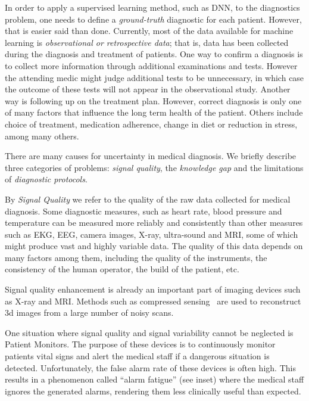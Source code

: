 \documentclass[11pt]{pnas-new}
\begin{document}

In order to apply a supervised learning method, such as  DNN, to the
diagnostics problem, one needs to define a {\em ground-truth} diagnostic for each
patient. However, that is easier said than done. Currently, most of
the data available for machine learning is {\em observational or
retrospective data}; that is, data has been collected
during the diagnosis and treatment of patients.
One way to confirm a diagnosis is to collect more information through
additional examinations and tests. However the attending medic might
judge additional tests to be unnecessary, in which case the outcome of these tests will not
appear in the observational study.
Another way is following up on the treatment plan. However, correct
diagnosis is only one of many factors that influence the long term
health of the patient. Others include choice of treatment, medication
adherence, change in diet or reduction in stress, among many others.


There are many causes for uncertainty in medical diagnosis. We briefly
describe three categories of problems: {\em signal quality}, the {\em
  knowledge gap} and the limitations of {\em diagnostic protocols}.

 
By {\em Signal Quality} we refer to the quality of the raw data
collected for medical diagnosis. Some diagnostic measures, such
as heart rate, blood pressure and temperature can be measured more reliably
and consistently than other
measures such as EKG, EEG, camera images, X-ray, ultra-sound and MRI, some of which might
produce vast and highly variable data. The quality of this data
depends on many factors among them, including the quality of the instruments, the
consistency of the human operator, the build of the patient, etc.

Signal quality enhancement is already an
important part of imaging devices such as X-ray and MRI. Methods such
as compressed sensing~\cite{lustig2008compressed} are used to
reconstruct 3d images from a large number of noisy scans.


  One situation where signal quality and signal variability cannot be neglected is Patient Monitors. 
  The purpose of these
devices is to continuously monitor patients vital signs and alert the
medical staff if a dangerous situation is detected. Unfortunately, the
false alarm rate of these devices is often high. This results in a
phenomenon called ``alarm fatigue'' (see inset) where the medical staff ignores
the generated alarms, rendering them less clinically useful than expected.
\end{document}
